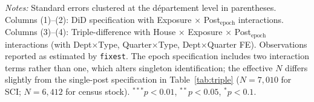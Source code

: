 \begin{table}[htbp]
\begin{threeparttable}
\begin{tabular}{lcccc}
\bottomrule
\end{tabular}
\begin{tablenotes}[flushleft]\footnotesize
\item \textit{Notes:} Standard errors clustered at the d\'epartement level in parentheses. Columns (1)--(2): DiD specification with Exposure $\times$ Post$_{\text{epoch}}$ interactions. Columns (3)--(4): Triple-difference with House $\times$ Exposure $\times$ Post$_{\text{epoch}}$ interactions (with Dept$\times$Type, Quarter$\times$Type, Dept$\times$Quarter FE). Observations reported as estimated by \texttt{fixest}. The epoch specification includes two interaction terms rather than one, which alters singleton identification; the effective $N$ differs slightly from the single-post specification in Table~\ref{tab:triple} ($N = 7{,}010$ for SCI; $N = 6{,}412$ for census stock). $^{***}p<0.01$, $^{**}p<0.05$, $^{*}p<0.1$.
\end{tablenotes}
\end{threeparttable}
\end{table}

